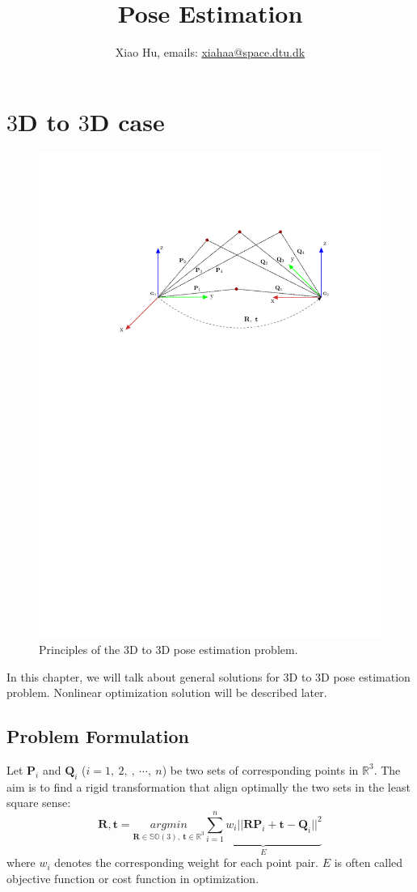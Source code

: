 \documentclass[a4paper]{report}
\begin{document}
\title{Pose Estimation}
\author{Xiao Hu, emails: \url{xiahaa@space.dtu.dk}}
\maketitle
\tableofcontents
\chapter{$3$D to $3$D case}
\begin{figure}
	\centering
	\includegraphics[scale=0.8]{hand_eye_files/vision/figures/p3.pdf}
	\caption{Principles of the $3$D to $3$D pose estimation problem.}
\end{figure}
In this chapter, we will talk about general solutions for 3D to 3D pose estimation problem. Nonlinear optimization solution will be described later.

\section{Problem Formulation}
Let $\mathbf{P}_i$ and $\mathbf{Q}_i$ ($i=1,\ 2,\ ,\ \cdots,\ n$) be two sets of corresponding points in $\mathbb{R}^{3}$. The aim is to find a rigid transformation that align optimally the two sets in the least square sense:
$$
\mathbf{R,t}=\underset{\mathbf{R}\in \mathbb{SO}(3),\ \mathbf{t} \in \mathbb{R}^3}{argmin} \underbrace{\sum_{i=1}^{n} w_i||\mathbf{RP}_i+\mathbf{t}-\mathbf{Q}_i||^2}_{E}
$$
where $w_i$ denotes the corresponding weight for each point pair. ${E}$ is often called objective function or cost function in optimization.
\end{document}

